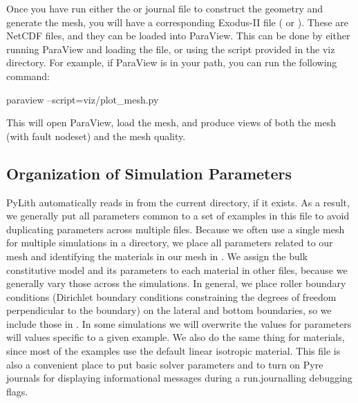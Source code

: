 Once you have run either the  or
journal file to construct the geometry and
generate the mesh, you will have a corresponding Exodus-II file
( or ). These are
NetCDF files, and they can be loaded into ParaView. This can be done
by either running ParaView and loading the file, or using the script
provided in the viz directory. For example, if ParaView is in your
path, you can run the following command:
\begin{shell}
  paraview --script=viz/plot_mesh.py
\end{shell}
This will open ParaView, load the mesh, and produce views of both the
mesh (with fault nodeset) and the mesh quality.

\subsection{Organization of Simulation Parameters}
\label{sec:example:reverse:2d:organization}

PyLith automatically reads in  from the
current directory, if it exists. As a result, we generally put all
parameters common to a set of examples in this file to avoid
duplicating parameters across multiple files. Because we often use a
single mesh for multiple simulations in a directory, we place all
parameters related to our mesh and identifying the materials in our
mesh in . We assign the bulk constitutive
model and its parameters to each material in other files, because we
generally vary those across the simulations. In general, we place roller
boundary conditions (Dirichlet boundary conditions constraining the
degrees of freedom perpendicular to the boundary) on the lateral and
bottom boundaries, so we include those in . In
some simulations we will overwrite the values for parameters will
values specific to a given example. We also do the same thing for
materials, since most of the examples use the default linear isotropic
material.  This file is also a convenient
place to put basic solver parameters and to turn on Pyre journals for
displaying informational messages during a run.journalling debugging
flags.

